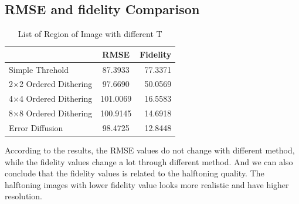 \documentclass[paper=a4, fontsize=11pt]{scrartcl} %
\numberwithin{equation}{section} %
\numberwithin{figure}{section} %
\numberwithin{table}{section} %
\begin{document}
\subsection{RMSE and fidelity Comparison}
\begin{table}[H]
	\centering  %
	\begin{tabular}{ |l | c | r|}  %
		\hline
		    &RMSE  & Fidelity\\
		    \hline
		Simple Threhold &87.3933 &77.3371\\
			    \hline
		2$\times$2 Ordered Dithering &97.6690 &50.0569\\
			    \hline
		4$\times$4 Ordered Dithering &101.0069 & 16.5583\\
			    \hline
		8$\times$8 Ordered Dithering &100.9145 &14.6918\\
			    \hline
		Error Diffusion &98.4725 &12.8448\\
		   \hline
	\end{tabular}
	\caption{List of Region of Image with different T}
	
\end{table}
\begin{flushleft}
{According to the results, the RMSE values do not change with different method, while the fidelity values change a lot through different method. And we can also conclude that the fidelity values is related to the halftoning quality. The halftoning images with lower fidelity value looks more realistic and have higher resolution. }
\end{flushleft}
\end{document}
